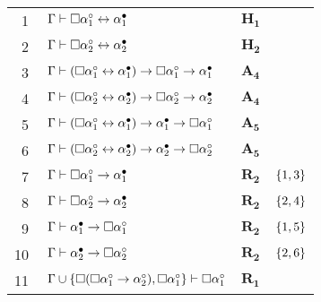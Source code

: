 \begin{tcolorbox}[enhanced jigsaw, breakable, sharp corners, colframe=black, colback=white, boxrule=0.5pt, left=1.5mm, right=1.5mm, top=1.5mm, bottom=1.5mm]
        \vspace{.5\baselineskip}
        \footnotesize
        \setlength{\rowskip}{.5\baselineskip}
        \begin{xltabular}{\textwidth}{r | X l l}
            \scriptsize{\phantom{0}1}\phantom{ } & $\ \Gamma \vdash \Box\alpha_1^\circ \leftrightarrow \alpha_1^\bullet$ & $\mathbf{H_1}$ & \\[\rowskip]
            \scriptsize{\phantom{0}2}\phantom{ } & $\ \Gamma \vdash \Box\alpha_2^\circ \leftrightarrow \alpha_2^\bullet$ & $\mathbf{H_2}$ & \\[\rowskip]
            \scriptsize{\phantom{0}3}\phantom{ } & $\ \Gamma \vdash (\Box\alpha_1^\circ \leftrightarrow \alpha_1^\bullet) \to \Box\alpha_1^\circ \to \alpha_1^\bullet$ & $\hyperref[modal.axiom.4]{\mathbf{A_4}}$ & \\[\rowskip]
            \scriptsize{\phantom{0}4}\phantom{ } & $\ \Gamma \vdash (\Box\alpha_2^\circ \leftrightarrow \alpha_2^\bullet) \to \Box\alpha_2^\circ \to \alpha_2^\bullet$ & $\hyperref[modal.axiom.4]{\mathbf{A_4}}$ & \\[\rowskip]
            \scriptsize{\phantom{0}5}\phantom{ } & $\ \Gamma \vdash (\Box\alpha_1^\circ \leftrightarrow \alpha_1^\bullet) \to \alpha_1^\bullet \to \Box\alpha_1^\circ$ & $\hyperref[modal.axiom.5]{\mathbf{A_5}}$ & \\[\rowskip]
            \scriptsize{\phantom{0}6}\phantom{ } & $\ \Gamma \vdash (\Box\alpha_2^\circ \leftrightarrow \alpha_2^\bullet) \to \alpha_2^\bullet \to \Box\alpha_2^\circ$ & $\hyperref[modal.axiom.5]{\mathbf{A_5}}$ & \\[\rowskip]
            \scriptsize{\phantom{0}7}\phantom{ } & $\ \Gamma \vdash \Box\alpha_1^\circ \to \alpha_1^\bullet$ & $\hyperref[modal.rule.2]{\mathbf{R_2}}$ & $\left\{1,3\right\}$\\[\rowskip]
            \scriptsize{\phantom{0}8}\phantom{ } & $\ \Gamma \vdash \Box\alpha_2^\circ \to \alpha_2^\bullet$ & $\hyperref[modal.rule.2]{\mathbf{R_2}}$ & $\left\{2,4\right\}$\\[\rowskip]
            \scriptsize{\phantom{0}9}\phantom{ } & $\ \Gamma \vdash \alpha_1^\bullet \to \Box\alpha_1^\circ$ & $\hyperref[modal.rule.2]{\mathbf{R_2}}$ & $\left\{1,5\right\}$\\[\rowskip]
            \scriptsize{10}\phantom{ } & $\ \Gamma \vdash \alpha_2^\bullet \to \Box\alpha_2^\circ$ & $\hyperref[modal.rule.2]{\mathbf{R_2}}$ & $\left\{2,6\right\}$\\[\rowskip]
            \scriptsize{11}\phantom{ } & $\ \Gamma \cup \left\{\Box(\Box\alpha_1^\circ \to \alpha_2^\circ), \Box\alpha_1^\circ\right\} \vdash \Box\alpha_1^\circ$ & $\hyperref[modal.rule.1]{\mathbf{R_1}}$ & \\[\rowskip]

\end{xltabular}
\end{tcolorbox}
